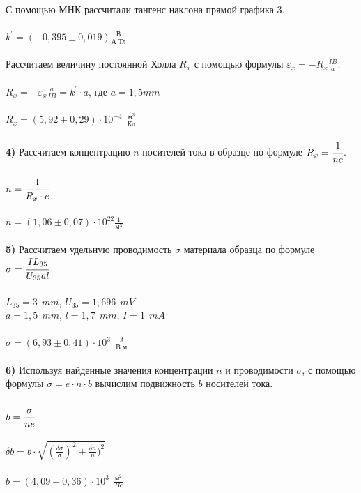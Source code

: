 \documentclass[11pt,a4paper]{article}
\begin{document}
\\
С помощью МНК рассчитали тангенс наклона прямой графика $3$. \\\\ $k^{'} = (-0,395 \pm 0,019) \frac{\text{В}}{\text{А Тл}}$ \\\\
Рассчитаем величину постоянной Холла $R_x$ с помощью формулы $\varepsilon_x= -R_x \frac{IB}{a}$.
\\\\
$R_x = - \varepsilon_x \frac{a}{IB} = k^{'} \cdot a$, где $a = 1,5 mm$ \\\\
$\boxed{R_x = (5,92 \pm 0,29) \cdot 10^{-4} \ \  \frac{\text{м}^3}{\text{Кл}}}$
\\\\
\textbf{4)} Рассчитаем концентрацию $n$ носителей тока в образце по формуле $R_x = \cfrac{1}{ne}$.
\\\\
$n = \cfrac{1}{R_x\cdot e}$
\\\\
$\boxed{n = (1,06 \pm 0,07) \cdot 10^{22} \frac{1}{\text{м}^{3}}}$
\\\\
\textbf{5)} Рассчитаем удельную проводимость $\sigma$ материала образца по формуле $\sigma = \cfrac{I L_{35}}{U_{35}al}$ \\\\
$L_{35} = 3 \ \  mm$, 
$U_{35} = 1,696 \ \ mV$ \\
$a = 1,5 \ \ mm$,
$l = 1,7 \ \ mm$, $I = 1 \ \ mA$
\\\\
$\boxed{\sigma = (6,93 \pm 0,41) \cdot 10^3 \ \ \frac{A}{\text{В м}}}$
\\\\
\textbf{6)} Используя найденные значения концентрации $n$ и проводимости $\sigma$, с помощью формулы $\sigma = e \cdot n \cdot b$ вычислим подвижность $b$ носителей тока. \\\\
$b = \cfrac {\sigma}{ne}$
\\\\
$\delta b = b \cdot \sqrt{(\frac{\delta \sigma}{\sigma})^2 +\frac{\delta n}{n})^2 }$
\\\\
$\boxed{b = (4,09 \pm 0,36) \cdot 10^3 \ \ \frac{\text{м}^2}{Bc}}$
\end{document}
